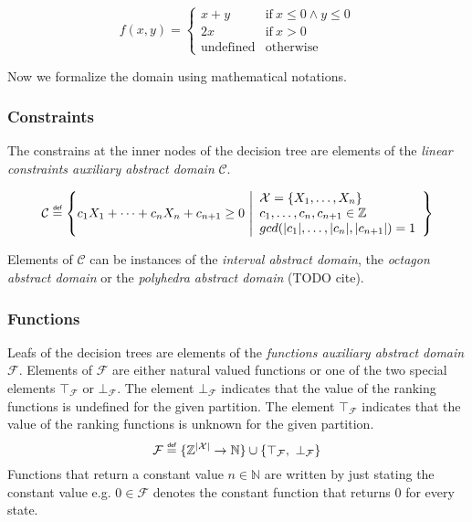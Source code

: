 \documentclass[11pt,a4paper,titlepage]{article}
\newcommand\eqdef{\mathrel{\overset{\makebox[0pt]{\mbox{\normalfont\tiny\sffamily def}}}{=}}}
\begin{document}
\[
    f(x, y) = \begin{cases}
            x+y                   & \text{if} \ x \leq 0 \land y \leq 0 \\
            2x                   & \text{if} \ x > 0 \\
            \text{undefined}    & \text{otherwise}
        \end{cases}
\]

Now we formalize the domain using mathematical notations.

\subsubsection*{Constraints}

The constrains at the inner nodes of the decision tree are elements of the 
\textit{linear constraints auxiliary abstract domain} $\mathcal{C}$.  

\[
    \mathcal{C} \eqdef 
    \left
        \{ 
        c_1 X_1 + \dots + c_n X_n + c_{n+1} \geq 0 \
        \middle\vert 
        \begin{array}{l}
            \mathcal{X} = \{X_1, \dots, X_n\}\\
            c_1, \dots, c_n, c_{n+1} \in \mathbb{Z} \\
            gcd(|c_1|, \dots, |c_n|, |c_{n+1}|) = 1
        \end{array}
    \right
    \}
\]

Elements of $\mathcal{C}$ can be instances of the \textit{interval abstract domain}, 
the \textit{octagon abstract domain} or the \textit{polyhedra abstract domain} (TODO cite).\\


\subsubsection*{Functions}

Leafs of the decision trees are elements of the \textit{functions auxiliary abstract domain} $\mathcal{F}$.
Elements of $\mathcal{F}$ are either natural valued functions or one of the two special elements $\top_{\mathcal{F}}$ or $\bot_{\mathcal{F}}$.
The element $\bot_{\mathcal{F}}$ indicates that the value of the ranking functions is undefined for the given partition. 
The element $\top_{\mathcal{F}}$ indicates that the value of the ranking functions is unknown for the given partition.
\[
    \mathcal{F} \eqdef \{ \mathbb{Z}^{|\mathcal{X}|} \rightarrow \mathbb{N} \} \cup \{ \top_{\mathcal{F}}, \ \bot_{\mathcal{F}} \}
\]
Functions that return a constant value $n \in \mathbb{N}$ are written by just stating the constant value e.g. $0 \in \mathcal{F}$ 
denotes the constant function that returns $0$ for every state.\\
\end{document}
